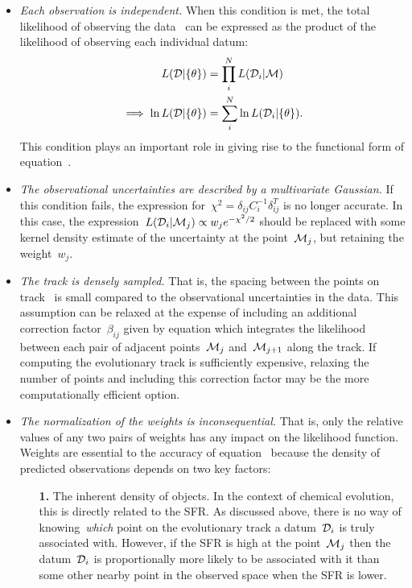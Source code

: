 \documentclass[ms.tex]{subfiles}
\begin{document}
\begin{itemize}
\begin{itemize}
		\item \textit{Each observation is independent.}
		When this condition is met, the total likelihood of observing the
		data~ can be expressed as the product of the likelihood of
		observing each individual datum:
		\begin{subequations}\begin{align}
		L(\mathcal{D} | \{\theta\}) &= \prod_i^N L(\mathcal{D}_i | \mathcal{M})
		\\
		\implies \ln L(\mathcal{D} | \{\theta\}) &= \sum_i^N \ln
		L(\mathcal{D}_i | \{\theta\}).
		\end{align}\end{subequations}
		This condition plays an important role in giving rise to the
		functional form of equation~.

		\item \textit{The observational uncertainties are described by a
		multivariate Gaussian.}
		If this condition fails, the expression for~$\chi^2 =
		\delta_{ij}C_i^{-1}\delta_{ij}^T$ is no longer accurate.
		In this case, the expression~$L(\mathcal{D}_i | \mathcal{M}_j) \propto
		w_j e^{-\chi^2/2}$ should be replaced with some kernel density
		estimate of the uncertainty at the point~$\mathcal{M}_j$, but retaining
		the weight~$w_j$.

		\item \textit{The track is densely sampled.}
		That is, the spacing between the points on track~ is small
		compared to the observational uncertainties in the data.
		This assumption can be relaxed at the expense of including an
		additional correction factor~$\beta_{ij}$ given by equation
		 which integrates the likelihood between each
		pair of adjacent points~$\mathcal{M}_j$ and~$\mathcal{M}_{j + 1}$ along
		the track.
		If computing the evolutionary track is sufficiently expensive,
		relaxing the number of points and including this correction factor may
		be the more computationally efficient option.

		\item \textit{The normalization of the weights is inconsequential.}
		That is, only the relative values of any two pairs of weights has any
		impact on the likelihood function.
		Weights are essential to the accuracy of equation~
		because the density of predicted observations depends on two key
		factors:
		\begin{itemize}
			\item[\textbf{1.}] The inherent density of objects.
			In the context of chemical evolution, this is directly related
			to the SFR.
			As discussed above, there is no way of knowing~\textit{which}
			point on the evolutionary track a datum~$\mathcal{D}_i$ is truly
			associated with.
			However, if the SFR is high at the point~$\mathcal{M}_j$ then the
			datum~$\mathcal{D}_i$ is proportionally more likely to be
			associated with it than some other nearby point in the observed
			space when the SFR is lower.


\end{itemize}
\end{itemize}
\end{itemize}
\end{document}

